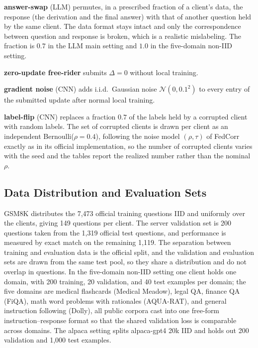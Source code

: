 \documentclass[letterpaper]{article} %
\theoremstyle{plain}
\begin{document}
\textbf{answer-swap} (LLM) permutes, in a prescribed fraction of a client's
data, the response (the derivation and the final answer) with that of another
question held by the same client. The data format stays intact and only the
correspondence between question and response is broken, which is a realistic
mislabeling. The fraction is $0.7$ in the LLM main setting and $1.0$ in the
five-domain non-IID setting.

\textbf{zero-update free-rider} submits $\Delta = 0$ without local training.

\textbf{gradient noise} (CNN) adds i.i.d.\ Gaussian noise
$\mathcal{N}(0, 0.1^2)$ to every entry of the submitted update after normal
local training.

\textbf{label-flip} (CNN) replaces a fraction $0.7$ of the labels held by a
corrupted client with random labels. The set of corrupted clients is drawn
per client as an independent Bernoulli($\rho{=}0.4$), following the noise
model $(\rho, \tau)$ of FedCorr \citep{xu2022fedcorr} exactly as in its
official implementation, so
the number of corrupted clients varies with the seed and the tables report
the realized number rather than the nominal $\rho$.

\subsection{Data Distribution and Evaluation Sets}
\label{app:data}

GSM8K distributes the 7{,}473 official training questions IID and uniformly
over the clients, giving 149 questions per client. The server validation set
is 200 questions taken from the 1{,}319 official test questions, and
performance is measured by exact match on the remaining 1{,}119. The
separation between training and evaluation data is the official split, and
the validation and evaluation sets are drawn from the same test pool, so they
share a distribution and do not overlap in questions. In the five-domain
non-IID setting one client holds one domain, with 200 training, 20
validation, and 40 test examples per domain; the five domains are medical
flashcards (Medical Meadow), legal QA, finance QA (FiQA), math word
problems with rationales (AQUA-RAT), and general instruction following
(Dolly), all public corpora cast into one free-form
instruction--response format so that the shared validation loss is
comparable across domains. The alpaca setting splits
alpaca-gpt4 20k IID and holds out 200 validation and 1{,}000 test examples.
\end{document}
